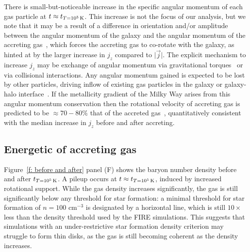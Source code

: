 \documentclass[fleqn,usenatbib]{mnras}
\newcommand{\tcon}{t_{T=10^5\,{\rm K}}}
\begin{document}
There is small-but-noticeable increase in the specific angular momentum of each gas particle at $t \approx \tcon$.
This increase is not the focus of our analysis, but we note that it may be a result of a difference in orientation and/or amplitude between the angular momentum of the galaxy and the angular momentum of the accreting gas~\citep[e.g.][]{Danovich2012, DeFelippis2017}, which forces the accreting gas to co-rotate with the galaxy, as hinted at by the larger increase in $j_z$ compared to $\vert \vec j \vert$.
The explicit mechanism to increase $j_z$ may be exchange of angular momentum via gravitational torques~\citep[e.g.][]{Danovich2015} or via collisional interactions.
Any angular momentum gained is expected to be lost by other particles, driving inflow of existing gas particles in the galaxy or galaxy-halo interface~\citep[e.g.][]{Mayor1981, Pezzulli2017}.
If the metallicity gradient of the Milky Way arises from this angular momentum conservation then the rotational velocity of accreting gas is predicted to be $\approx 70-80\%$ that of the accreted gas~\citep{Pezzulli2016a}, quantitatively consistent with the median increase in $j_z$ before and after accreting.

\subsection{Energetic of accreting gas}
\label{s: mechanics -- energy balance}

Figure~\ref{f: before and after} panel (F) shows the baryon number density before and after $\tcon$.
A pileup occurs at $t\approx \tcon$, induced by increased rotational support.
While the gas density increases significantly, the gas is still significantly below any threshold for star formation:
a minimal threshold for star formation of $n = 100$ cm$^{-3}$ is designated by a horizontal line, which is still $10\times$ less than the density threshold used by the FIRE simulations.
This suggests that simulations with an under-restrictive star formation density criterion may struggle to form thin disks, as the gas is still becoming coherent as the density increases.
\end{document}
